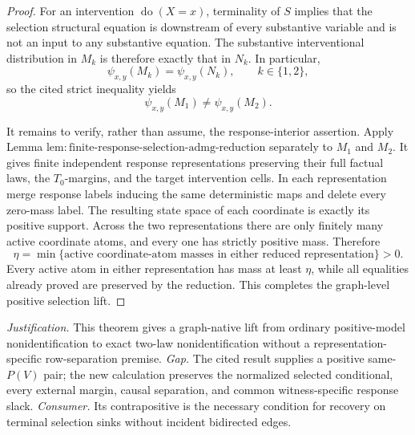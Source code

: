 \documentclass{article}
\begin{document}
\begin{proof}
For an intervention \(\operatorname{do}(X=x)\), terminality of \(S\) implies that the selection structural equation is downstream of every substantive variable and is not an input to any substantive equation. The substantive interventional distribution in \(M_k\) is therefore exactly that in \(N_k\). In particular,
\[
 \psi_{x,y}(M_k)=\psi_{x,y}(N_k),\qquad k\in\{1,2\},
\]
so the cited strict inequality yields
\[
 \psi_{x,y}(M_1)\ne\psi_{x,y}(M_2).
\]

It remains to verify, rather than assume, the response-interior assertion. Apply Lemma \(\mathrm{lem{:}finite\text{-}response\text{-}selection\text{-}admg\text{-}reduction}\) separately to \(M_1\) and \(M_2\). It gives finite independent response representations preserving their full factual laws, the \(T_0\)-margins, and the target intervention cells. In each representation merge response labels inducing the same deterministic maps and delete every zero-mass label. The resulting state space of each coordinate is exactly its positive support. Across the two representations there are only finitely many active coordinate atoms, and every one has strictly positive mass. Therefore
\[
 \eta=\min\{\text{active coordinate-atom masses in either reduced representation}\}>0.
\]
Every active atom in either representation has mass at least \(\eta\), while all equalities already proved are preserved by the reduction. This completes the graph-level positive selection lift.
\end{proof}
\par\smallskip\noindent \textit{Justification.} This theorem gives a graph-native lift from ordinary positive-model nonidentification to exact two-law nonidentification without a representation-specific row-separation premise. \textit{Gap.} The cited result supplies a positive same-\(P(V)\) pair; the new calculation preserves the normalized selected conditional, every external margin, causal separation, and common witness-specific response slack. \textit{Consumer.} Its contrapositive is the necessary condition for recovery on terminal selection sinks without incident bidirected edges.
\end{document}
